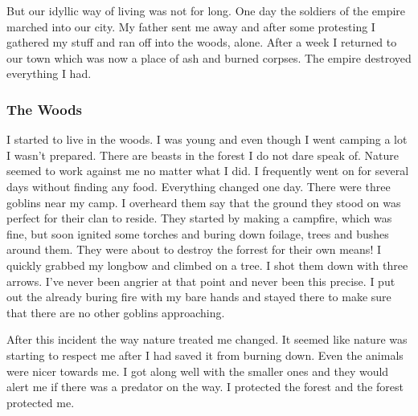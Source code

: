 \documentclass[letterpaper,10pt,twoside,twocolumn,openany]{book}
\begin{document}
	But our idyllic way of living was not for long. One day the soldiers of the empire marched into our city. My father sent me away and after some protesting I gathered my stuff and ran off into the woods, alone. After a week I returned to our town which was now a place of ash and burned corpses. The empire destroyed everything I had. 
	
	\subsubsection{The Woods}
	I started to live in the woods. I was young and even though I went camping a lot I wasn’t prepared. There are beasts in the forest I do not dare speak of. Nature seemed to work against me no matter what I did. I frequently went on for several days without finding any food. Everything changed one day. There were three goblins near my camp. I overheard them say that the ground they stood on was perfect for their clan to reside. They started by making a campfire, which was fine, but soon ignited some torches and buring down foilage, trees and bushes around them. They were about to destroy the forrest for their own means! I quickly grabbed my longbow and climbed on a tree. I shot them down with three arrows. I’ve never been angrier at that point and never been this precise. I put out the already buring fire with my bare hands and stayed there to make sure that there are no other goblins approaching.
	
	After this incident the way nature treated me changed. It seemed like nature was starting to respect me after I had saved it from burning down. Even the animals were nicer towards me. I got along well with the smaller ones and they would alert me if there was a predator on the way. I protected the forest and the forest protected me. 
	
\end{document}
